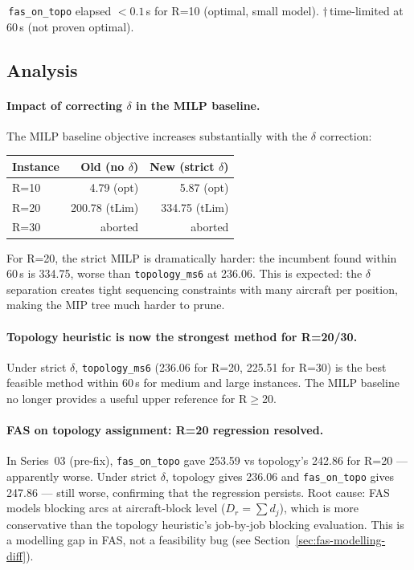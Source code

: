 \noindent *\,\texttt{fas\_on\_topo} elapsed $<0.1$\,s for R=10 (optimal, small model).
$\dagger$\,time-limited at 60\,s (not proven optimal).

\subsection{Analysis}
\label{exp:exp04-analysis}

\paragraph{Impact of correcting $\delta$ in the MILP baseline.}

The MILP baseline objective increases substantially with the $\delta$ correction:

\begin{center}
\begin{tabular}{lrr}
\toprule
Instance & Old (no $\delta$) & New (strict $\delta$) \\
\midrule
R=10 & 4.79 (opt) & 5.87 (opt) \\
R=20 & 200.78 (tLim) & 334.75 (tLim) \\
R=30 & aborted & aborted \\
\bottomrule
\end{tabular}
\end{center}

For R=20, the strict MILP is dramatically harder: the incumbent found within
60\,s is 334.75, worse than \texttt{topology\_ms6} at 236.06.  This is
expected: the $\delta$ separation creates tight sequencing constraints with
many aircraft per position, making the MIP tree much harder to prune.

\paragraph{Topology heuristic is now the strongest method for R=20/30.}

Under strict $\delta$, \texttt{topology\_ms6} (236.06 for R=20, 225.51 for
R=30) is the best feasible method within 60\,s for medium and large instances.
The MILP baseline no longer provides a useful upper reference for R$\geq$20.

\paragraph{FAS on topology assignment: R=20 regression resolved.}

In Series~03 (pre-fix), \texttt{fas\_on\_topo} gave 253.59 vs topology's
242.86 for R=20 — apparently worse.  Under strict $\delta$, topology gives
236.06 and \texttt{fas\_on\_topo} gives 247.86 — still worse, confirming
that the regression persists.  Root cause: FAS models blocking arcs at
aircraft-block level ($D_r = \sum d_j$), which is more conservative than
the topology heuristic's job-by-job blocking evaluation.  This is a
modelling gap in FAS, not a feasibility bug (see
Section~\ref{sec:fas-modelling-diff}).

